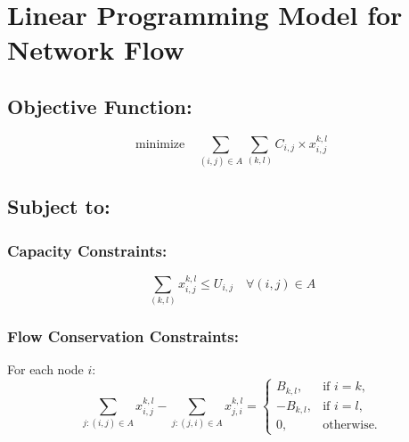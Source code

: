 \documentclass{article}
\begin{document}
\section*{Linear Programming Model for Network Flow}

\subsection*{Objective Function:}
\[
\text{minimize} \quad \sum_{(i,j) \in A} \sum_{(k, l)} C_{i,j} \times x_{i,j}^{k,l}
\]

\subsection*{Subject to:}

\subsubsection*{Capacity Constraints:}
\[
\sum_{(k, l)} x_{i,j}^{k,l} \leq U_{i,j} \quad \forall (i, j) \in A
\]

\subsubsection*{Flow Conservation Constraints:}
For each node \( i \):
\[
\sum_{j: (i,j) \in A} x_{i,j}^{k,l} - \sum_{j: (j,i) \in A} x_{j,i}^{k,l} = 
\begin{cases} 
B_{k,l}, & \text{if } i = k, \\
-B_{k,l}, & \text{if } i = l, \\
0, & \text{otherwise.}
\end{cases}
\]
\end{document}
